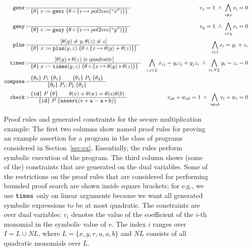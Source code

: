 \documentclass[preprint]{sig-alternate-05-2015}
\begin{document}
\begin{figure}
    \begin{eqnarray*}
      \ttrule{\genx}{}{\hoare{\theta}{v := \genx}{\theta \circ \{v \mapsto pol2vec(``x'')\}}}{ v_x = 1 \;\wedge\; \bigwedge_{i\neq x} v_i = 0}
        \\
        \ttrule{\geny}{}{\hoare{\theta}{v := \geny}{\theta \circ \{v \mapsto pol2vec(``y'')\}}}{ v_y = 1\;\wedge\; \bigwedge_{i\neq y} v_i = 0}
        \\
        \ttrule{\plus}{[\theta(y)\neq y, \theta(z)\neq z]}%
        {\hoare{\theta}{x := \plus(y,z)}{\theta \circ \{x \mapsto \theta(y) + \theta(z)\}}}{ \bigwedge_{i\in I} x_i = y_i + z_i}
        \\
        \ttrule{\timess}%
        {[\theta(y)*\theta(z) \mbox{ is quadratic}]}%
        {\hoare{\theta}{x := \timess(y,z)}{\theta \circ \{x \mapsto \theta(y)*\theta(z)\}}}{ \bigwedge_{i,j\in L}x_{ij} = y_iz_j+y_jz_i \;\wedge\;\bigwedge_{i\in NL} y_i=z_i=0 }%
        \\
        \ttrule{\mathtt{compose}}%
        {\hoare{\theta_0}{P_1}{\theta_1} \qquad \hoare{\theta_1}{P_2}{\theta_2}}%
        {\hoare{\theta_0}{P_1;P_2}{\theta_2}}{}%
        \\
        \ttrule{\mathtt{check}}%
        {\hoare{\mathtt{id}}{P}{\theta} \qquad \theta(v)+\theta(w)=\theta(a)\theta(b)}%
        {\hoare{\mathtt{id}}{P}{\mathtt{assert(v+w=a*b)}}}%
        {v_{ab}+w_{ab}=1\;\wedge\; \bigwedge_{i\neq ab} v_i+w_i=0}%
      \end{eqnarray*}
      \caption{Proof rules and generated constraints for the secure multiplication example: The first two columns show named proof rules for proving an example assertion for a program in the class of programs considered in Section~\ref{sec:ex}.  Essentially, the rules perform symbolic execution of the program.  The third column shows (some of the) constraints that are generated on the dual variables. Some of the restrictions on the proof rules that are considered for performing bounded proof search are shown inside square brackets; for e.g., we use $\mbox{${\mathtt{times}}$}$ only on linear arguments because we want all generated symbolic expressions to be at most quadratic. The constraints are over dual variables: $v_i$ denotes the value of the coefficient of the $i$-th monomial in the symbolic value of $v$. The index $i$ ranges over $I=L\cup NL$, where $L = \{x,y,r,u,a,b\}$ and $NL$ consists of all quadratic monomials over $L$.}
  \label{fig:rules0}
\end{figure}
\end{document}
